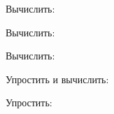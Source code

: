\begin{listofex}
	\item Вычислить:
	\begin{enumcols}[itemcolumns=2]
		\item {}
		\item {}
	\end{enumcols}
	\item Вычислить:
	\begin{enumcols}[itemcolumns=3]
		\item {}
		\item {}
		\item {}
		\item {}
	\end{enumcols}
	\item Вычислить:
	\begin{enumcols}[itemcolumns=3]
		\item {}
		\item {}
		\item {}
	\end{enumcols}
	\item {}
	\item Упростить и вычислить:
	\begin{enumcols}[itemcolumns=2]
		\item {}
		\item {}
	\end{enumcols}
	\item Упростить:
	\begin{enumcols}[itemcolumns=2]
		\item {}
		\item {}
	\end{enumcols}
	\item {}
	\item {}
\end{listofex}
